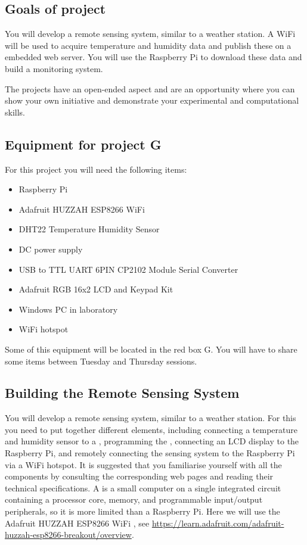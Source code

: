 \subsection{Goals of project}

You will develop a remote sensing system, similar to a weather station.
A WiFi \microcontroller will be used to acquire temperature and humidity data and publish these on a embedded web server.
You will use the Raspberry Pi to download these data and build a monitoring system.

The projects have an open-ended aspect and are an opportunity where you can show your own initiative and demonstrate your experimental and computational skills. 


\subsection{Equipment for project G}

For this project you will need the following items:
\begin{itemize}
\item Raspberry Pi
\item Adafruit HUZZAH ESP8266 WiFi \microcontroller
\item DHT22 Temperature Humidity Sensor 
\item DC power supply
\item USB to TTL UART 6PIN CP2102 Module Serial Converter
\item Adafruit RGB 16x2 LCD and Keypad Kit 
\item Windows PC in laboratory
\item WiFi hotspot 
\end{itemize}
Some of this equipment will be located in the red box G.
You will have to share some items between Tuesday and Thursday sessions. 


\subsection{Building the Remote Sensing System}

You will develop a remote sensing system, similar to a weather station.
For this you need to put together different elements, including connecting a temperature and humidity sensor to a \microcontroller, programming the \microcontroller,
connecting an LCD display to the Raspberry Pi, and remotely connecting the sensing system to the Raspberry Pi via a WiFi hotspot.
It is suggested that you familiarise yourself with all the components
by consulting the corresponding web pages and reading their technical specifications.
A \microcontroller is a small computer on a single integrated circuit containing a processor core, memory, and programmable input/output peripherals, so it is more limited than a Raspberry Pi.
Here we will use the Adafruit HUZZAH ESP8266 WiFi \microcontroller, see \url{https://learn.adafruit.com/adafruit-huzzah-esp8266-breakout/overview}.


